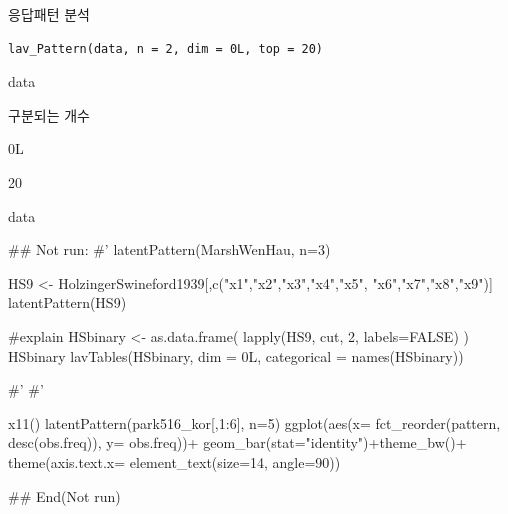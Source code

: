 \documentclass[a4paper]{book}
\begin{document}
%
\begin{Description}
응답패턴 분석
\end{Description}
%
\begin{Usage}
\begin{verbatim}
lav_Pattern(data, n = 2, dim = 0L, top = 20)
\end{verbatim}
\end{Usage}
%
\begin{Arguments}
\begin{ldescription}
\item[\code{data}] data

\item[\code{n}] 구분되는 개수

\item[\code{dim}] 0L

\item[\code{top}] 20
\end{ldescription}
\end{Arguments}
%
\begin{Value}
data
\end{Value}
%
\begin{Examples}
\begin{ExampleCode}

\#\# Not run: 
#'
latentPattern(MarshWenHau, n=3)

HS9 <- HolzingerSwineford1939[,c("x1","x2","x3","x4","x5",
                                 "x6","x7","x8","x9")]
latentPattern(HS9)

#explain
HSbinary <- as.data.frame( lapply(HS9, cut, 2, labels=FALSE) )
HSbinary %
lavTables(HSbinary, dim = 0L, categorical = names(HSbinary)) %

#'
#'

x11()
latentPattern(park516_kor[,1:6], n=5) %
  ggplot(aes(x= fct_reorder(pattern, desc(obs.freq)), y= obs.freq))+
  geom_bar(stat="identity")+theme_bw()+
  theme(axis.text.x= element_text(size=14, angle=90))

## End(Not run)


\end{ExampleCode}
\end{Examples}
\end{document}
